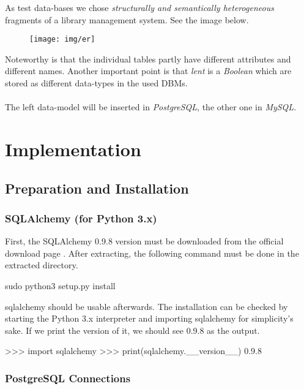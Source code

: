 \documentclass[11pt, a4paper]{article}
\begin{document}
As test data-bases we chose \textit{structurally and semantically heterogeneous} fragments of a library management system. See the image below.


\begin{figure}[H]
	\centering
	\texttt{[image: img/er]}
\end{figure}

Noteworthy is that the individual tables partly have different attributes and different names. Another important point is that \textit{lent} is a \textit{Boolean} which are stored as different data-types in the used DBMs.
\\\\
The left data-model will be inserted in \textit{PostgreSQL}, the other one in \textit{MySQL}.

\section{Implementation}

\subsection{Preparation and Installation}

\subsubsection{SQLAlchemy (for Python 3.x)}

First, the SQLAlchemy 0.9.8 version must be downloaded from the official download page \cite{sqlalchemy:download}.
After extracting, the following command must be done in the extracted directory.

\begin{bash}
sudo python3 setup.py install
\end{bash}

sqlalchemy should be usable afterwards. The installation can be checked by starting the Python 3.x interpreter and importing sqlalchemy for simplicity's sake. If we print the version of it, we should see 0.9.8 as the output.

\begin{bash}
>>> import sqlalchemy
>>> print(sqlalchemy.__version__)
0.9.8
\end{bash}

\subsubsection{PostgreSQL Connections}
\end{document}
